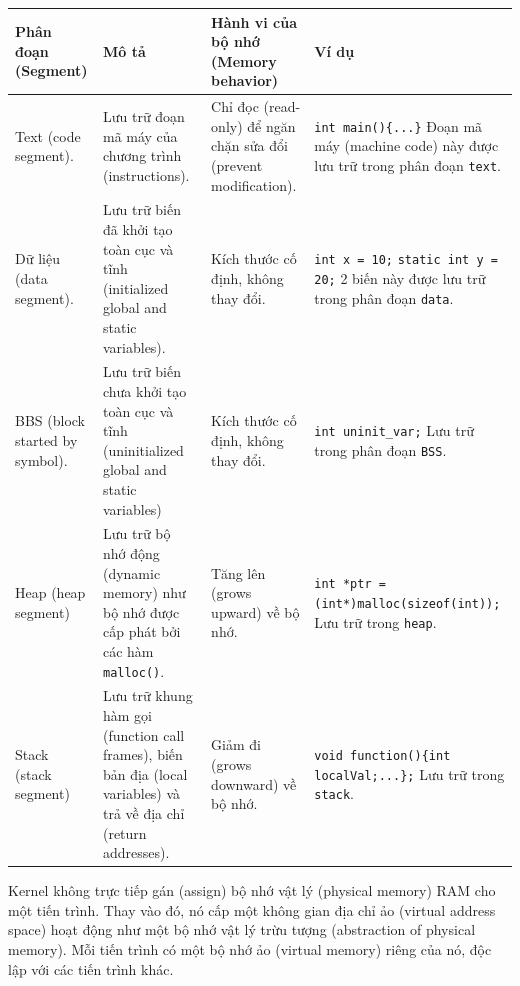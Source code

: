 \documentclass{article}
\begin{document}
\begin{center}
    \begin{table}[h]
        \begin{tabularx}{\linewidth}{|X|X|X|X|}
        \hline
        \textbf{Phân đoạn} \newline (Segment) & \textbf{Mô tả} & \textbf{Hành vi của bộ nhớ} \newline (Memory behavior) & \textbf{Ví dụ} \\ \hline
        Text (code segment). & Lưu trữ đoạn mã máy của chương trình (instructions). & Chỉ đọc (read-only) để ngăn chặn sửa đổi (prevent modification). &\verb|int main(){...}| \newline Đoạn mã máy (machine code) này được lưu trữ trong phân đoạn \verb|text|. \\ \hline
        Dữ liệu (data segment). & Lưu trữ biến đã khởi tạo toàn cục và tĩnh (initialized global and static variables). & Kích thước cố định, không thay đổi. & \verb|int x = 10;| \newline \verb|static int y = 20;| 2 biến này được lưu trữ trong phân đoạn \verb|data|. \\ \hline
        BBS (block started by symbol). & Lưu trữ biến chưa khởi tạo toàn cục và tĩnh (uninitialized global and static variables) &  Kích thước cố định, không thay đổi. & \verb|int uninit_var;| \newline Lưu trữ trong phân đoạn \verb|BSS|. \\ \hline
        Heap (heap segment) & Lưu trữ bộ nhớ động (dynamic memory) như bộ nhớ được cấp phát bởi các hàm \verb|malloc()|. & Tăng lên (grows upward) về bộ nhớ. & \verb|int *ptr = (int*)|\newline\verb|malloc(sizeof(int))|\newline \verb|;| \newline Lưu trữ trong \verb|heap|.\\ \hline
        Stack (stack segment)& Lưu trữ khung hàm gọi (function call frames), biến bản địa (local variables) và trả về địa chỉ (return addresses). & Giảm đi (grows downward) về bộ nhớ. & \verb|void function()|\newline \verb|{int localVal;...};| \newline Lưu trữ trong \verb|stack|.\\ \hline
        \end{tabularx}
        \end{table}
\end{center}
Kernel không trực tiếp gán (assign) bộ nhớ vật lý (physical memory) RAM cho một tiến trình. Thay vào đó, nó cấp một không gian địa chỉ ảo (virtual address space) hoạt động như một bộ nhớ vật lý trừu tượng (abstraction of physical memory). Mỗi tiến trình có một bộ nhớ ảo (virtual memory) riêng của nó, độc lập với các tiến trình khác.
\end{document}
